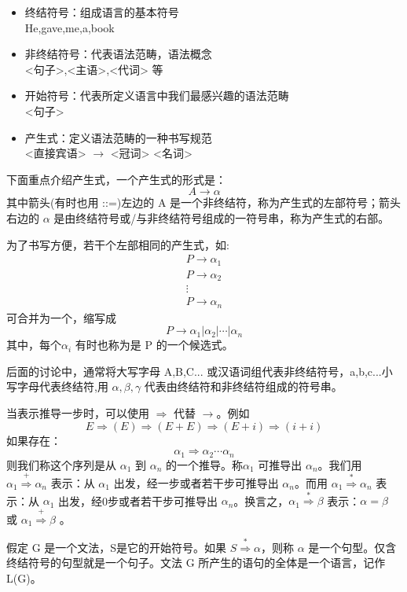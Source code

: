 \begin{itemize}
	\item 终结符号：组成语言的基本符号 \\
	      He,gave,me,a,book
	\item 非终结符号：代表语法范畴，语法概念 \\
	      <句子>,<主语>,<代词> 等
	\item 开始符号：代表所定义语言中我们最感兴趣的语法范畴 \\
	      <句子>
	\item 产生式：定义语法范畴的一种书写规范\\
	      <直接宾语> $\rightarrow$ <冠词> <名词>
\end{itemize}

下面重点介绍产生式，一个产生式的形式是：
\[A \rightarrow \alpha\]
其中箭头(有时也用 ::=)左边的 A 是一个非终结符，称为产生式的左部符号；箭头右边的 $\alpha$ 是由终结符号或/与非终结符号组成的一符号串，称为产生式的右部。

为了书写方便，若干个左部相同的产生式，如:
\begin{equation}
	\begin{aligned}
		P \rightarrow \alpha_1 \\
		P \rightarrow \alpha_2 \\
		\vdots                 \\
		P \rightarrow \alpha_n \nonumber
	\end{aligned}
\end{equation}
可合并为一个，缩写成
\[ P \rightarrow \alpha_1 | \alpha_2 | \cdots | \alpha_n \]
其中，每个$\alpha_i$ 有时也称为是 P 的一个候选式。

后面的讨论中，通常将大写字母 A,B,C... 或汉语词组代表非终结符号，a,b,c...小写字母代表终结符,用 $\alpha,\beta,\gamma$ 代表由终结符和非终结符组成的符号串。

当表示推导一步时，可以使用 $\Rightarrow$ 代替 $\rightarrow$。例如
\[ E \Rightarrow (E) \Rightarrow (E+E) \Rightarrow (E+i) \Rightarrow (i+i) \]
如果存在：
\[ \alpha_1 \Rightarrow \alpha_2 \cdots \alpha_n \]
则我们称这个序列是从 $\alpha_1$ 到 $\alpha_n$ 的一个推导。称$\alpha_1$ 可推导出 $\alpha_n$。我们用 $\alpha_1 \stackrel{+}{\Rightarrow} \alpha_n$ 表示：从 $\alpha_1$ 出发，经一步或者若干步可推导出 $\alpha_n$。而用 $\alpha_1 \stackrel{*}{\Rightarrow} \alpha_n$ 表示：从 $\alpha_1$ 出发，经0步或者若干步可推导出 $\alpha_n$。换言之，$\alpha_1 \stackrel{*}{\Rightarrow} \beta$ 表示：$\alpha = \beta$ 或 $\alpha_1 \stackrel{+}{\Rightarrow} \beta$ 。

假定 G 是一个文法，S是它的开始符号。如果 $S \stackrel{*}{\Rightarrow} \alpha$，则称 $\alpha$ 是一个句型。仅含终结符号的句型就是一个句子。文法 G 所产生的语句的全体是一个语言，记作 L(G)。

